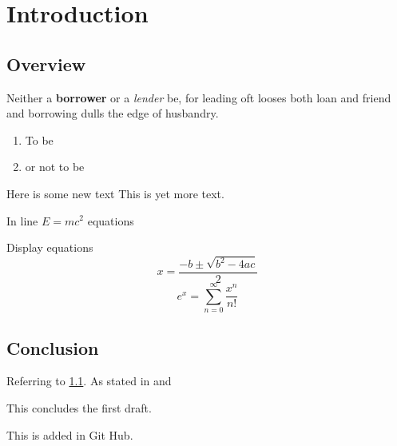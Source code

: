 \chapter{Introduction}

\section{Overview}
\label{Sec:Overview}

Neither a \textbf{borrower} or a \textit{lender} be, for leading oft looses both loan and friend and borrowing dulls the edge of husbandry.
\begin{enumerate}
\item To be
\item or not to be

\end{enumerate}

Here is some new text This is yet more text.

In line $E=mc^2$ equations

Display equations
\[
x=\frac{-b\pm\sqrt{b^2-4ac}}{2}
\]
\[
e^x = \sum_{n=0}^\infty\frac{x^n}{n!}
\]
\section{Conclusion}

Referring to \ref{Sec:Overview}. As stated in \cite[Section 2]{Bunce1992TheAlgebra} and \cite{Kaup1977AlgebraicBanachmanifolds}

This concludes the first draft.

This is added in Git Hub.

